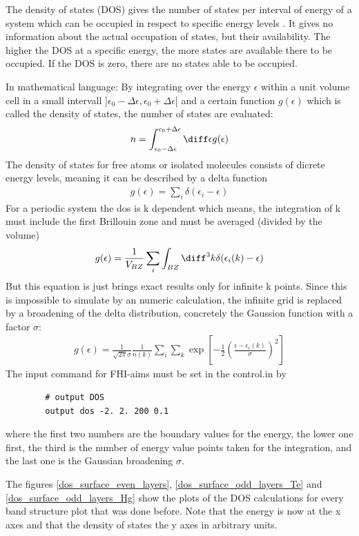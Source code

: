 	The density of states (DOS) gives the number of states per interval of energy of a system which can be occupied in respect to specific energy levels \cite{tutorial2}.
	It gives no information about the actual occupation of states, but their availability. The higher the DOS at a specific energy, the more states are available there to be occupied. If the DOS is zero, there are no states able to be occupied. 
	
	In mathematical language: 
	By integrating over the energy $\epsilon$ within a unit volume cell in a small intervall $]\epsilon_0 - \Delta \epsilon , \epsilon_0 + \Delta \epsilon[$ and a certain function $g(\epsilon)$ which is called the density of states, the number of states are evaluated:
	\begin{align}
		n = \int_{\epsilon_0 - \Delta \epsilon}^{\epsilon_0 + \Delta \epsilon} \diff \epsilon g(\epsilon)
	\end{align}
	The density of states for free atoms or isolated molecules consists of dicrete energy levels, meaning it can be described by a delta function
	\begin{align}
		g(\epsilon) = \sum_i \delta(\epsilon_i - \epsilon)
	\end{align}
	For a periodic system the dos is k dependent which means, the integration of k must include the first Brillouin zone and must be averaged (divided by the volume)
	\begin{align}
		g(\epsilon) = \frac{1}{V_{BZ}} \sum_i \int_{BZ} \diff^3 k \delta (\epsilon_i(k) - \epsilon)  
	\end{align}
	But this equation is just brings exact results only for infinite k points. Since this is impossible to simulate by an numeric calculation, the infinite grid is replaced by a broadening of the delta distribution, concretely the Gaussion function with a factor $\sigma$:
	\begin{align}
		g(\epsilon) = \frac{1}{\sqrt{2\pi} \sigma} \frac{1}{n(k)} 
		\sum_i \sum_k \exp 
		\left[
			-\frac{1}{2} \left(
				\frac{\epsilon - \epsilon_i(k)}{\sigma}
			\right)^2
		\right]
	\end{align}
	The input command for FHI-aims must be set in the control.in by
	\begin{verbatim}
		# output DOS
		output dos -2. 2. 200 0.1
	\end{verbatim}
	where the first two numbers are the boundary values for the energy, the lower one first, the third is the number of energy value points taken for the integration, and the last one is the Gaussian broadening $\sigma$. 
	 
	The figures \ref{dos_surface_even_layers}, \ref{dos_surface_odd_layers_Te} and \ref{dos_surface_odd_layers_Hg} show the plots of the DOS calculations for every band structure plot that was done before. Note that the energy is now at the x axes and that the density of states the y axes in arbitrary units.   
	
